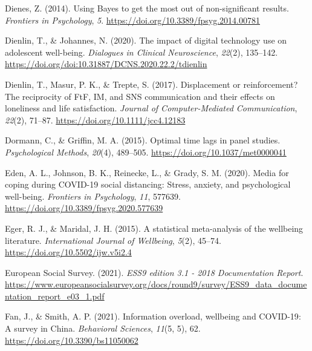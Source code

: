 \documentclass[
  man,mask,floatsintext]{apa7}
\newlength{\cslhangindent}
\newlength{\cslentryspacingunit} %
\newenvironment{CSLReferences}[2] %
 {%
  \setlength{\parindent}{0pt}
  \ifodd #1
  \let\oldpar\par
  \def\par{\hangindent=\cslhangindent\oldpar}
  \fi
  \setlength{\parskip}{#2\cslentryspacingunit}
 }%
 {}
\begin{document}
\begin{CSLReferences}{1}{0}
\leavevmode{}%
Dienes, Z. (2014). Using {Bayes} to get the most out of non-significant results. \emph{Frontiers in Psychology}, \emph{5}. \url{https://doi.org/10.3389/fpsyg.2014.00781}

\leavevmode{}%
Dienlin, T., \& Johannes, N. (2020). The impact of digital technology use on adolescent well-being. \emph{Dialogues in Clinical Neuroscience}, \emph{22}(2), 135--142. \url{https://doi.org/doi:10.31887/DCNS.2020.22.2/tdienlin}

\leavevmode{}%
Dienlin, T., Masur, P. K., \& Trepte, S. (2017). Displacement or reinforcement? {The} reciprocity of {FtF}, {IM}, and {SNS} communication and their effects on loneliness and life satisfaction. \emph{Journal of Computer-Mediated Communication}, \emph{22}(2), 71--87. \url{https://doi.org/10.1111/jcc4.12183}

\leavevmode{}%
Dormann, C., \& Griffin, M. A. (2015). Optimal time lags in panel studies. \emph{Psychological Methods}, \emph{20}(4), 489--505. \url{https://doi.org/10.1037/met0000041}

\leavevmode{}%
Eden, A. L., Johnson, B. K., Reinecke, L., \& Grady, S. M. (2020). Media for coping during {COVID-19} social distancing: {Stress}, anxiety, and psychological well-being. \emph{Frontiers in Psychology}, \emph{11}, 577639. \url{https://doi.org/10.3389/fpsyg.2020.577639}

\leavevmode{}%
Eger, R. J., \& Maridal, J. H. (2015). A statistical meta-analysis of the wellbeing literature. \emph{International Journal of Wellbeing}, \emph{5}(2), 45--74. \url{https://doi.org/10.5502/ijw.v5i2.4}

\leavevmode{}%
European Social Survey. (2021). \emph{{ESS9} edition 3.1 - 2018 {Documentation Report}}. \url{https://www.europeansocialsurvey.org/docs/round9/survey/ESS9_data_documentation_report_e03_1.pdf}

\leavevmode{}%
Fan, J., \& Smith, A. P. (2021). Information overload, wellbeing and {COVID-19}: {A} survey in {China}. \emph{Behavioral Sciences}, \emph{11}(5, 5), 62. \url{https://doi.org/10.3390/bs11050062}


\end{CSLReferences}
\end{document}
